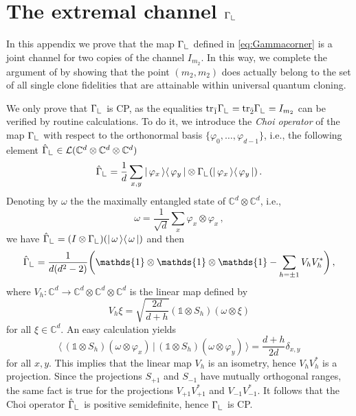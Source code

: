 \documentclass[12pt,reqno]{amsart}
\theoremstyle{definition}
\newcommand{\ip}[2]{\langle\,#1\,\vert\,#2\,\rangle} %
\newcommand{\kb}[2]{\vert\,#1\,\rangle\langle\,#2\,\vert} %
\newcommand{\ptr}[2]{{\rm tr}_{#1} #2} %
\newcommand{\id}{\mathds{1}} %
\newcommand{\Lcorner}{{\mathchoice{\mathrel{\makebox[7pt][c]{\rule{.4pt}{7.5pt}\rule{5pt}{.4pt}}}}{\mathrel{\makebox[7pt][c]{\rule{.4pt}{7.5pt}\rule{5pt}{.4pt}}}}{\mathrel{\makebox[5.5pt][c]{\rule{.4pt}{5.25pt}\rule{3.5pt}{.4pt}}}}{\mathrel{\makebox[4pt][c]{\rule{.4pt}{3.75pt}\rule{2.5pt}{.4pt}}}}}}
\newcommand{\phii}{\varphi} %
\newcommand{\Cb}{\mathbb{C}} %
\newcommand{\elle}[1]{\mathcal{L}(#1)} %
\begin{document}
\section{The extremal channel $\Gamma_\Lcorner$}\label{app:Gamma_J}

In this appendix we prove that the map $\Gamma_\Lcorner$ defined in \eqref{eq:Gammacorner} is a joint channel for two copies of the channel $I_{m_2}$. In this way, we complete the argument of \cite[Eq.~(24) and Fig.~B.1]{Hashagen17} by showing that the point $(m_2,m_2)$ does actually belong to the set of all single clone fidelities that are attainable within universal quantum cloning.

We only prove that $\Gamma_\Lcorner$ is CP, as the equalities $\ptr{\bar{1}}{\Gamma_\Lcorner} = \ptr{\bar{2}}{\Gamma_\Lcorner} = I_{m_2}$ can be verified by routine calculations. To do it, we introduce the {\em Choi operator} of the map $\Gamma_\Lcorner$ with respect to the orthonormal basis $\{\phii_0,\ldots,\phii_{d-1}\}$, i.e., the following element $\hat{\Gamma}_\Lcorner\in\elle{\Cb^d\otimes\Cb^d\otimes\Cb^d}$
$$
\hat{\Gamma}_\Lcorner = \frac{1}{d}\sum_{x,y}\kb{\phii_x}{\phii_y}\otimes\Gamma_\Lcorner(\kb{\phii_x}{\phii_y})\,.
$$
Denoting by $\omega$ the the maximally entangled state of $\Cb^d\otimes\Cb^d$, i.e.,
$$
\omega = \frac{1}{\sqrt{d}}\sum_x\phii_x\otimes\phii_x\,,
$$
we have $\hat{\Gamma}_\Lcorner = (I\otimes\Gamma_\Lcorner)(\kb{\omega}{\omega})$ and then
$$
\hat{\Gamma}_\Lcorner = \frac{1}{d(d^2-2)}\bigg(\id\otimes\id\otimes\id - \sum_{h=\pm 1} V_hV_h^*\bigg)\,,
$$
where $V_h:\Cb^d\to\Cb^d\otimes\Cb^d\otimes\Cb^d$ is the linear map defined by
$$
V_h\xi = \sqrt{\frac{2d}{d+h}}(\id\otimes S_h)(\omega\otimes\xi)
$$
for all $\xi\in\Cb^d$. An easy calculation yields
$$
\ip{(\id\otimes S_h)(\omega\otimes\phii_x)}{(\id\otimes S_h)(\omega\otimes\phii_y)} = \frac{d+h}{2d}\delta_{x,y}
$$
for all $x,y$. This implies that the linear map $V_h$ is an isometry, hence $V_hV_h^*$ is a projection. Since the projections $S_{+1}$ and $S_{-1}$ have mutually orthogonal ranges, the same fact is true for the projections $V_{+1}V_{+1}^*$ and $V_{-1}V_{-1}^*$. It follows that the Choi operator $\hat{\Gamma}_\Lcorner$ is positive semidefinite, hence $\Gamma_\Lcorner$ is CP.
\end{document}
